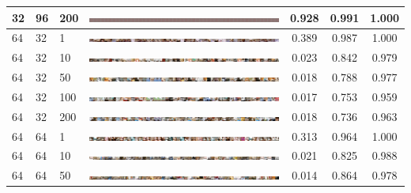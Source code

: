 \documentclass[a4paper]{article}
\begin{document}
\begin{table}[h!]
\begin{center}
{\begin{tabular}{lllcccc}
      32 & 96 & 200 & \includegraphics[width=\textwidth,trim={1536px 0 0 0},clip]{figures/bedrooms_g32_d96_ep200_generator.jpg}  & 0.928 & 0.991 & 1.000\\
      \hline
      64 & 32 & 1   & \includegraphics[width=\textwidth,trim={1536px 0 0 0},clip]{figures/bedrooms_g64_d32_ep1_generator.jpg}    & 0.389 & 0.987 & 1.000\\
      64 & 32 & 10  & \includegraphics[width=\textwidth,trim={1536px 0 0 0},clip]{figures/bedrooms_g64_d32_ep10_generator.jpg}   & 0.023 & 0.842 & 0.979\\
      64 & 32 & 50  & \includegraphics[width=\textwidth,trim={1536px 0 0 0},clip]{figures/bedrooms_g64_d32_ep50_generator.jpg}   & 0.018 & 0.788 & 0.977\\
      64 & 32 & 100 & \includegraphics[width=\textwidth,trim={1536px 0 0 0},clip]{figures/bedrooms_g64_d32_ep100_generator.jpg}  & 0.017 & 0.753 & 0.959\\
      64 & 32 & 200 & \includegraphics[width=\textwidth,trim={1536px 0 0 0},clip]{figures/bedrooms_g64_d32_ep200_generator.jpg}  & 0.018 & 0.736 & 0.963\\
      \hline
      64 & 64 & 1   & \includegraphics[width=\textwidth,trim={1536px 0 0 0},clip]{figures/bedrooms_g64_d64_ep1_generator.jpg}    & 0.313 & 0.964 & 1.000\\
      64 & 64 & 10  & \includegraphics[width=\textwidth,trim={1536px 0 0 0},clip]{figures/bedrooms_g64_d64_ep10_generator.jpg}   & 0.021 & 0.825 & 0.988\\
      64 & 64 & 50  & \includegraphics[width=\textwidth,trim={1536px 0 0 0},clip]{figures/bedrooms_g64_d64_ep50_generator.jpg}   & 0.014 & 0.864 & 0.978\\

\end{tabular}}
\end{center}
\end{table}
\end{document}
